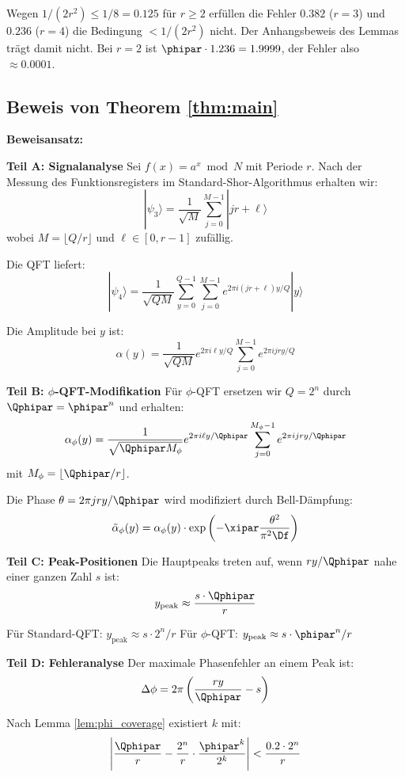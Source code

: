 Wegen $1/(2r^2) \leq 1/8 = 0.125$ für $r \geq 2$ erfüllen die Fehler $0.382$ ($r = 3$) und $0.236$ ($r = 4$) die Bedingung $< 1/(2r^2)$ nicht. Der Anhangsbeweis des Lemmas trägt damit nicht. Bei $r = 2$ ist $\phipar \cdot 1.236 = 1.9999$, der Fehler also $\approx 0.0001$.

\subsection{Beweis von Theorem \ref{thm:main}}
\label{app:proof_main}

\textbf{Beweisansatz:}

\textbf{Teil A: Signalanalyse}
Sei $f(x) = a^x \bmod N$ mit Periode $r$. Nach der Messung des Funktionsregisters im Standard-Shor-Algorithmus erhalten wir:
\[
|\psi_3\rangle = \frac{1}{\sqrt{M}} \sum_{j=0}^{M-1} |jr + \ell\rangle
\]
wobei $M = \lfloor Q/r \rfloor$ und $\ell \in [0, r-1]$ zufällig.

Die QFT liefert:
\[
|\psi_4\rangle = \frac{1}{\sqrt{QM}} \sum_{y=0}^{Q-1} \sum_{j=0}^{M-1} e^{2\pi i (jr + \ell)y/Q} |y\rangle
\]

Die Amplitude bei $y$ ist:
\[
\alpha(y) = \frac{1}{\sqrt{QM}} e^{2\pi i \ell y/Q} \sum_{j=0}^{M-1} e^{2\pi i j r y/Q}
\]

\textbf{Teil B: $\phi$-QFT-Modifikation}
Für $\phi$-QFT ersetzen wir $Q = 2^n$ durch $\Qphipar = \phipar^n$ und erhalten:
\[
\alpha_{\phi}(y) = \frac{1}{\sqrt{\Qphipar M_{\phi}}} e^{2\pi i \ell y/\Qphipar} \sum_{j=0}^{M_{\phi}-1} e^{2\pi i j r y/\Qphipar}
\]
mit $M_{\phi} = \lfloor \Qphipar/r \rfloor$.

Die Phase $\theta = 2\pi j r y/\Qphipar$ wird modifiziert durch Bell-Dämpfung:
\[
\tilde{\alpha}_{\phi}(y) = \alpha_{\phi}(y) \cdot \exp\left(-\xipar \frac{\theta^2}{\pi^2 \Df}\right)
\]

\textbf{Teil C: Peak-Positionen}
Die Hauptpeaks treten auf, wenn $ry/\Qphipar$ nahe einer ganzen Zahl $s$ ist:
\[
y_{\text{peak}} \approx \frac{s \cdot \Qphipar}{r}
\]

Für Standard-QFT: $y_{\text{peak}} \approx s \cdot 2^n / r$
Für $\phi$-QFT: $y_{\text{peak}} \approx s \cdot \phipar^n / r$

\textbf{Teil D: Fehleranalyse}
Der maximale Phasenfehler an einem Peak ist:
\[
\Delta\phi = 2\pi \left( \frac{ry}{\Qphipar} - s \right)
\]

Nach Lemma \ref{lem:phi_coverage} existiert $k$ mit:
\[
\left| \frac{\Qphipar}{r} - \frac{2^n}{r} \cdot \frac{\phipar^k}{2^k} \right| < \frac{0.2 \cdot 2^n}{r}
\]


